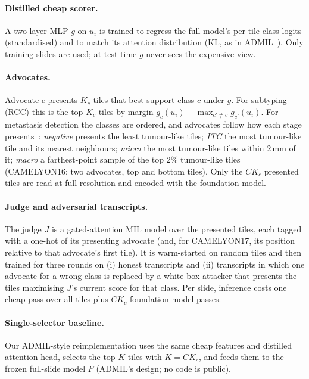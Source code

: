 \documentclass[runningheads]{llncs}
\begin{document}
\paragraph{Distilled cheap scorer.} A two-layer MLP $g$ on $u_i$ is trained to regress the full model's per-tile class logits (standardised) and to match its attention distribution (KL, as in ADMIL~\cite{admil2026}). Only training slides are used; at test time $g$ never sees the expensive view.

\paragraph{Advocates.} Advocate $c$ presents $K_c$ tiles that best support class $c$ under $g$. For subtyping (RCC) this is the top-$K_c$ tiles by margin $g_c(u_i)-\max_{c'\neq c}g_{c'}(u_i)$. For metastasis detection the classes are ordered, and advocates follow how each stage presents~\cite{camelyon17}: \emph{negative} presents the least tumour-like tiles; \emph{ITC} the most tumour-like tile and its nearest neighbours; \emph{micro} the most tumour-like tiles within 2\,mm of it; \emph{macro} a farthest-point sample of the top 2\% tumour-like tiles (CAMELYON16: two advocates, top and bottom tiles). Only the $CK_c$ presented tiles are read at full resolution and encoded with the foundation model.

\paragraph{Judge and adversarial transcripts.} The judge $J$ is a gated-attention MIL model over the presented tiles, each tagged with a one-hot of its presenting advocate (and, for CAMELYON17, its position relative to that advocate's first tile). It is warm-started on random tiles and then trained for three rounds on (i) honest transcripts and (ii) transcripts in which one advocate for a wrong class is replaced by a white-box attacker that presents the tiles maximising $J$'s current score for that class. Per slide, inference costs one cheap pass over all tiles plus $CK_c$ foundation-model passes.

\paragraph{Single-selector baseline.} Our ADMIL-style reimplementation uses the same cheap features and distilled attention head, selects the top-$K$ tiles with $K=CK_c$, and feeds them to the frozen full-slide model $F$ (ADMIL's design; no code is public).
\end{document}
